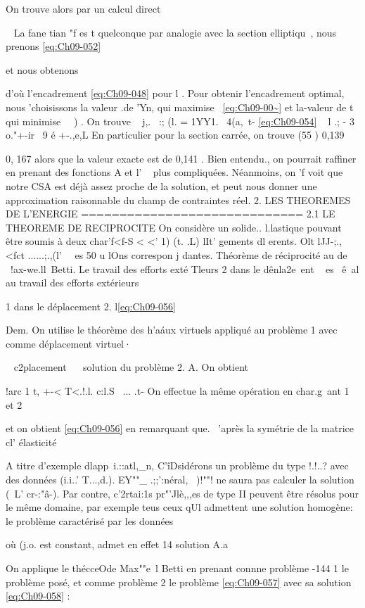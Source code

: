 {On trouve alors par un calcul direct 

~ 
La fane tian "f es t quelconque par analogie avec la section elliptiqu~, nous prenons 
\eqref{eq:Ch09-052} 

et nous obtenons 

d'où l'encadrement \eqref{eq:Ch09-048} pour l . Pour obtenir l'encadrement optimal, nous 'choisissons la valeur .de 'Yn, qui maximise ~\eqref{eq:Ch09-00~} et la-valeur de t qui mi­nimise ~~) . On trouve 
~ j,.~
:; (l. 
=
1YY1.~ 
4(a,~t-%
\eqref{eq:Ch09-054} ~ l .;
-
3 o."+-ir~ 9 é +-.,e,L 
En particulier pour la section carrée, on trouve 
(55 ) 0,139 

0, 167 
alors que la valeur exacte est de 0,141 . Bien entendu., on pourrait raffi­ner en prenant des fonctions A et l' ~ plus compliquées. Néanmoins, on
'f 
voit que notre CSA est déjà assez proche de la solution, et peut nous donner une approximation raisonnable du champ de contraintes réel. 
2. LES THEOREMES DE L'ENERGIE 
============================= 
2.1 LE THEOREME DE RECIPROCITE 
On considère un solide.. l.lastique pouvant être soumis à deux char­'f<f-S < <' 1) (t. .L) lIt'
gements dl erents. Olt lJJ-;.,<fct ......;.,(l'~~ es 50 u lOns correspon
j
dantes. 
Théorème de réciprocité au de ~!ax-we.ll~Betti. Le travail des efforts exté­
Tleurs 2 dans le dênla2e~ent ~ es~ ê~al au travail des efforts extérieurs 

1 dans le déplacement 2. 
l\eqref{eq:Ch09-056} 


Dem. On utilise le théorème des h'a\'aux virtuels appliqué au problème 1 avec comme déplacement virtuel·}~ c2placement ~~ solution du problème 2. 
A. 
On obtient 

!arc 1 t,
+-< T<.!.l. c:l.S
\ ... .t-
On effectue la même opération en char.g~ant 1 et 2 

et on obtient \eqref{eq:Ch09-056} en remarquant que. ~'après la symétrie de la matrice cl' élasticité 

A titre d'exemple dlapp~i.::atl,_n, C'îDsidérons un problème du type !.!..? avec des données (i.i..' T...,d.). EY""_ .;;':néral, ~)!""! ne saura pas calculer la so­lution (~L' cr-:"â-). Par contre, c'2rtai:1s pr"'Jlè,,,es de type II peuvent être résolus pour le même domaine, par exemple teus ceux qUl admettent une solu­tion homogène: le problème caractérisé par les données 

où (j.o. est constant, admet en effet 14 solution 
A.a 

On applique le thécceO\e de Max""e\ l Betti en prenant connne problème 
-144 
1 le problème posé, et 	comme problème 2 le problème \eqref{eq:Ch09-057} avec sa solution 
\eqref{eq:Ch09-058} : 

